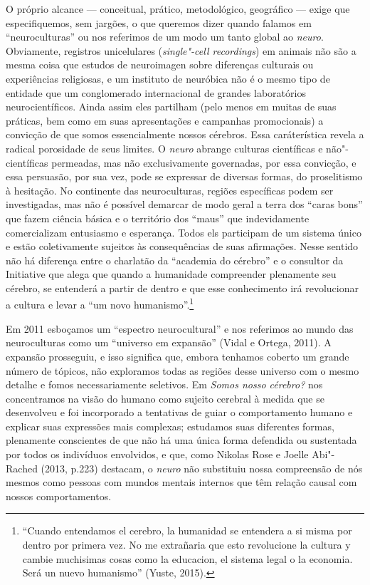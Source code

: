O próprio alcance --- conceitual, prático, metodológico, geográfico ---
exige que especifiquemos, sem jargões, o que queremos dizer quando
falamos em ``neuroculturas'' ou nos referimos de um modo um tanto global
ao \emph{neuro}. Obviamente, registros unicelulares (\emph{single"-cell
recordings}) em animais não são a mesma coisa que estudos de neuroimagen
sobre diferenças culturais ou experiências religiosas, e um instituto de
neuróbica não é o mesmo tipo de entidade que um conglomerado
internacional de grandes laboratórios neurocientíficos. Ainda assim eles
partilham (pelo menos em muitas de suas práticas, bem como em suas
apresentações e campanhas promocionais) a convicção de que somos
essencialmente nossos cérebros. Essa caráterística revela a radical
porosidade de seus limites. O \emph{neuro} abrange culturas científicas
e não"-científicas permeadas, mas não exclusivamente governadas, por essa
convicção, e essa persuasão, por sua vez, pode se expressar de diversas
formas, do proselitismo à hesitação. No continente das neuroculturas,
regiões específicas podem ser investigadas, mas não é possível demarcar
de modo geral a terra dos ``caras bons'' que fazem ciência básica e o
território dos ``maus'' que indevidamente comercializam entusiasmo e
esperança. Todos els participam de um sistema único e estão
coletivamente sujeitos às consequências de suas afirmações. Nesse
sentido não há diferença entre o charlatão da ``academia do cérebro'' e
o consultor da  Initiative que alega que quando a humanidade
compreender plenamente seu cérebro, se entenderá a partir de dentro e
que esse conhecimento irá revolucionar a cultura e levar a ``um novo
humanismo''.\footnote{``Cuando entendamos el cerebro, la humanidad se entendera a si misma
por dentro por primera vez. No me extrañaria que esto revolucione la
cultura y cambie muchisimas cosas como la educacion, el sistema legal o
la economia. Será un nuevo humanismo'' (Yuste, 2015).}

Em 2011 esboçamos um ``espectro neurocultural'' e nos referimos ao mundo
das neuroculturas como um ``universo em expansão'' (Vidal e Ortega,
2011). A expansão prosseguiu, e isso significa que, embora tenhamos
coberto um grande número de tópicos, não exploramos todas as regiões
desse universo com o mesmo detalhe e fomos necessariamente seletivos. Em
\emph{Somos nosso cérebro?} nos concentramos na visão do humano como
sujeito cerebral à medida que se desenvolveu e foi incorporado a
tentativas de guiar o comportamento humano e explicar suas expressões
mais complexas; estudamos suas diferentes formas, plenamente conscientes
de que não há uma única forma defendida ou sustentada por todos os
indivíduos envolvidos, e que, como Nikolas Rose e Joelle Abi"-Rached
(2013, p.223) destacam, o \emph{neuro} não substituiu nossa compreensão
de nós mesmos como pessoas com mundos mentais internos que têm relação
causal com nossos comportamentos.


